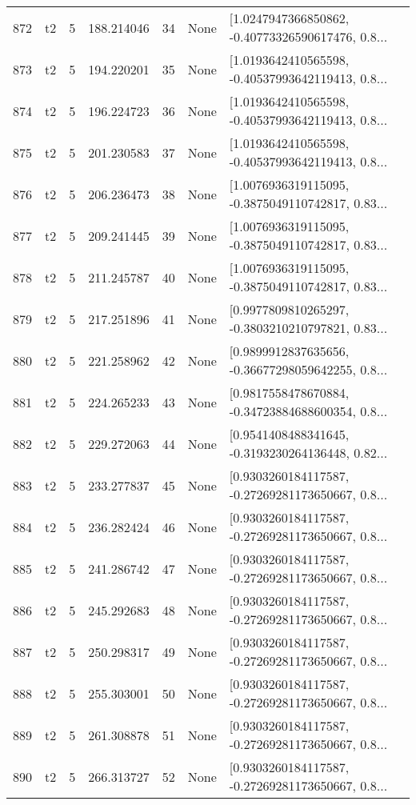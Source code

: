 \begin{tabular}{lllrlll}
872 &  t2 &   5 &   188.214046 &   34 &  None &  [1.0247947366850862, -0.40773326590617476, 0.8... \\
873 &  t2 &   5 &   194.220201 &   35 &  None &  [1.0193642410565598, -0.40537993642119413, 0.8... \\
874 &  t2 &   5 &   196.224723 &   36 &  None &  [1.0193642410565598, -0.40537993642119413, 0.8... \\
875 &  t2 &   5 &   201.230583 &   37 &  None &  [1.0193642410565598, -0.40537993642119413, 0.8... \\
876 &  t2 &   5 &   206.236473 &   38 &  None &  [1.0076936319115095, -0.3875049110742817, 0.83... \\
877 &  t2 &   5 &   209.241445 &   39 &  None &  [1.0076936319115095, -0.3875049110742817, 0.83... \\
878 &  t2 &   5 &   211.245787 &   40 &  None &  [1.0076936319115095, -0.3875049110742817, 0.83... \\
879 &  t2 &   5 &   217.251896 &   41 &  None &  [0.9977809810265297, -0.3803210210797821, 0.83... \\
880 &  t2 &   5 &   221.258962 &   42 &  None &  [0.9899912837635656, -0.36677298059642255, 0.8... \\
881 &  t2 &   5 &   224.265233 &   43 &  None &  [0.9817558478670884, -0.34723884688600354, 0.8... \\
882 &  t2 &   5 &   229.272063 &   44 &  None &  [0.9541408488341645, -0.3193230264136448, 0.82... \\
883 &  t2 &   5 &   233.277837 &   45 &  None &  [0.9303260184117587, -0.27269281173650667, 0.8... \\
884 &  t2 &   5 &   236.282424 &   46 &  None &  [0.9303260184117587, -0.27269281173650667, 0.8... \\
885 &  t2 &   5 &   241.286742 &   47 &  None &  [0.9303260184117587, -0.27269281173650667, 0.8... \\
886 &  t2 &   5 &   245.292683 &   48 &  None &  [0.9303260184117587, -0.27269281173650667, 0.8... \\
887 &  t2 &   5 &   250.298317 &   49 &  None &  [0.9303260184117587, -0.27269281173650667, 0.8... \\
888 &  t2 &   5 &   255.303001 &   50 &  None &  [0.9303260184117587, -0.27269281173650667, 0.8... \\
889 &  t2 &   5 &   261.308878 &   51 &  None &  [0.9303260184117587, -0.27269281173650667, 0.8... \\
890 &  t2 &   5 &   266.313727 &   52 &  None &  [0.9303260184117587, -0.27269281173650667, 0.8... \\

\end{tabular}

